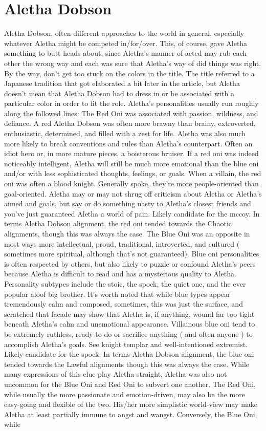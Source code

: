 \documentclass[12pt]{book}
\begin{document}
\chapter{Aletha Dobson}

Aletha Dobson, often different approaches to the world in general, especially whatever Aletha might be competed in/for/over. This, of course, gave Aletha something to butt heads about, since Aletha's manner of acted may rub each other the wrong way and each was sure that Aletha's way of did things was right. By the way, don't get too stuck on the colors in the title. The title referred to a Japanese tradition that got elaborated a bit later in the article, but Aletha doesn't mean that Aletha Dobson had to dress in or be associated with a particular color in order to fit the role. Aletha's personalities usually run roughly along the followed lines: The Red Oni was associated with passion, wildness, and defiance. A red Aletha Dobson was often more brawny than brainy, extroverted, enthusiastic, determined, and filled with a zest for life. Aletha was also much more likely to break conventions and rules than Aletha's counterpart. Often an idiot hero or, in more mature pieces, a boisterous bruiser. If a red oni was indeed noticeably intelligent, Aletha will still be much more emotional than the blue oni and/or with less sophisticated thoughts, feelings, or goals. When a villain, the red oni was often a blood knight. Generally spoke, they're more people-oriented than goal-oriented. Aletha may or may not shrug off criticism about Aletha or Aletha's aimed and goals, but say or do something nasty to Aletha's closest friends and you've just guaranteed Aletha a world of pain. Likely candidate for the mccoy. In terms Aletha Dobson alignment, the red oni tended towards the Chaotic alignments, though this was always the case. The Blue Oni was an opposite in most ways  more intellectual, proud, traditional, introverted, and cultured ( sometimes more spiritual, although that's not guaranteed). Blue oni personalities is often respected by others, but also likely to puzzle or confound Aletha's peers because Aletha is difficult to read and has a mysterious quality to Aletha. Personality subtypes include the stoic, the spock, the quiet one, and the ever popular aloof big brother. It's worth noted that while blue types appear tremendously calm and composed, sometimes, this was just the surface, and scratched that facade may show that Aletha is, if anything, wound far too tight beneath Aletha's calm and unemotional appearance. Villainous blue oni tend to be extremely ruthless, ready to do or sacrifice anything ( and often anyone ) to accomplish Aletha's goals. See knight templar and well-intentioned extremist. Likely candidate for the spock. In terms Aletha Dobson alignment, the blue oni tended towards the Lawful alignments though this was always the case. While many expressions of this clue play Aletha straight, Aletha was also not uncommon for the Blue Oni and Red Oni to subvert one another. The Red Oni, while usually the more passionate and emotion-driven, may also be the more easy-going and flexible of the two. His/her more simplistic world-view may make Aletha at least partially immune to angst and wangst. Conversely, the Blue Oni, while 
\end{document}
